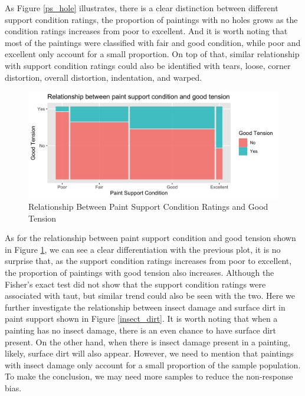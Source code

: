 \documentclass[11pt, oneside]{article}
\begin{document}
\noindent As Figure \ref{ps_hole} illustrates, there is a clear distinction between different support condition ratings, the proportion of paintings with no holes grows as the condition ratings increases from poor to excellent. And it is worth noting that most of the paintings were classified with fair and good condition, while poor and excellent only account for a small proportion. On top of that, similar relationship with support condition ratings could also be identified with tears, loose, corner distortion, overall distortion, indentation, and warped.

\begin{figure}[H]
    \centering
    \includegraphics[scale=0.18]{images/ps_tension_mosaic.png}
    \caption{Relationship Between Paint Support Condition Ratings and Good Tension}
    \label{ps_tension}
\end{figure}

\noindent As for the relationship between paint support condition and good tension shown in Figure \ref{ps_tension}, we can see a clear differentiation with the previous plot, it is no surprise that, as the support condition ratings increases from poor to excellent, the proportion of paintings with good tension also increases. Although the Fisher's exact test did not show that the support condition ratings were associated with taut, but similar trend could also be seen with the two.
\bigbreak
\noindent Here we further investigate the relationship between insect damage and surface dirt in paint support shown in Figure \ref{insect_dirt}. It is worth noting that when a painting has no insect damage, there is an even chance to have surface dirt present. On the other hand, when there is insect damage present in a painting, likely, surface dirt will also appear. However, we need to mention that paintings with insect damage only account for a small proportion of the sample population. To make the conclusion, we may need more samples to reduce the non-response bias.
\end{document}
